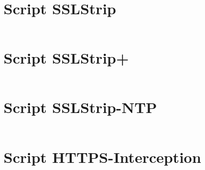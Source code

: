 \begin{appendices}

  \chapter{Script SSLStrip}

  \inputminted{python}{../sslstrip/immortal/sslstrip.py}

  \chapter{Script SSLStrip+}

  \inputminted{python}{../sslstrip2/immortal/sslstrip2.py}

  \chapter{Script SSLStrip-NTP}

  \inputminted{python}{../sslstrip-ntp/immortal/sslstrip-ntp.py}

  \chapter{Script HTTPS-Interception}

  \inputminted{python}{../https-interception/immortal/https-interception.py}

\end{appendices}
